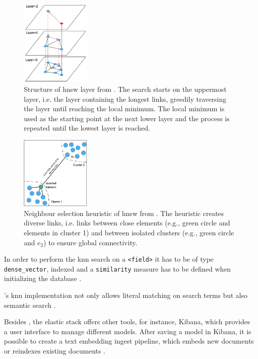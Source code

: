 \begin{figure}[htp] %
    \centering
    \includegraphics[width=0.3\textwidth]{images/Elasticsearch/HNSW-layer.png}
    \caption{Structure of \ac{hnsw} layer from \cite{Elasticsearch-kNN-HNSW}.
    The search starts on the uppermost layer, i.e. the layer containing the longest links, greedily traversing the layer until reaching the local minimum.
    The local minimum is used as the starting point at the next lower layer and the process is repeated until the lowest layer is reached.
    }
    \label{fig:hnsw-layer}
\end{figure}

\begin{figure}[htp] %
    \centering
    \includegraphics[width=0.3\textwidth]{images/Elasticsearch/HNSW-neighbour-selection-heuristic.png}
    \caption{Neighbour selection heuristic of \ac{hnsw} from \cite{Elasticsearch-kNN-HNSW}.
    The heuristic creates diverse links, i.e. links between close elements (e.g., green circle and elements in cluster 1) 
    and between isolated clusters (e.g., green circle and $e_2$) to ensure global connectivity.
    }
    \label{fig:hnsw-heuristic}
\end{figure}

In order to perform the \ac{knn} search on a \texttt{<field>} it has to be of type \texttt{dense\_vector}, indexed and a \texttt{similarity} measure has to be defined when initializing the database \cite{Elasticsearch-knn}.


\databaseName{}'s \ac{knn} implementation not only allows literal matching on search terms but also semantic search \cite{Elasticsearch-knn}.

Besides \databaseName{}, the elastic stack offers other tools, for instance, Kibana, which provides a user interface to manage different models.
After saving a model in Kibana, it is possible to create a text embedding ingest pipeline, which embeds new documents or reindexes existing documents \cite{Elasticsearch-knn-embedding}.
